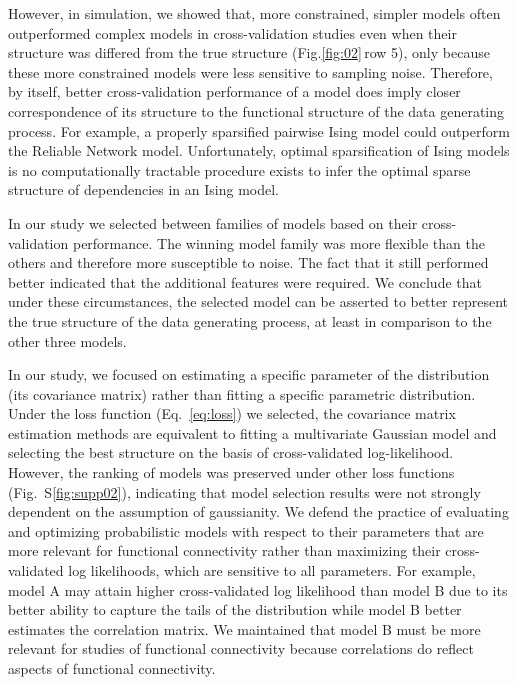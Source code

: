 \documentclass[10pt]{article}
\newcommand{\figref}[2]{Fig.\;\ref{fig:#1}\,#2}
\begin{document}
However, in simulation, we showed that, more constrained, simpler models often outperformed complex models in cross-validation studies even when their structure was differed from the true structure (\figref{02}{row 5}), only because these more constrained models were less sensitive to sampling noise. Therefore, by itself, better cross-validation performance of a model does imply closer correspondence of its structure to the functional structure of the data generating process. For example, a properly sparsified pairwise Ising model could outperform the Reliable Network model.  Unfortunately, optimal sparsification of Ising models is no computationally tractable procedure exists to infer the optimal sparse structure of dependencies in an Ising model.

In our study we selected between families of models based on their cross-validation performance. The winning model family was more flexible than the others and therefore more susceptible to noise. The fact that it still performed better indicated that the additional features were required. We conclude that under these circumstances, the selected model can be asserted to better represent the true structure of the data generating process, at least in comparison to the other three models.

In our study, we focused on estimating a specific parameter of the distribution (its covariance matrix) rather than fitting a specific parametric distribution.  Under the loss function (Eq.~\ref{eq:loss}) we selected, the covariance matrix estimation methods are equivalent to fitting a multivariate Gaussian model and selecting the best structure on the basis of cross-validated log-likelihood. However, the ranking of models was preserved under other loss functions (Fig.~S\ref{fig:supp02}), indicating that model selection results were not strongly dependent on the assumption of gaussianity. We defend the practice of evaluating and optimizing probabilistic models with respect to their parameters that are more relevant for functional connectivity rather than maximizing their cross-validated log likelihoods, which are sensitive to all parameters. For example, model A may attain higher cross-validated log likelihood than model B due to its better ability to capture the tails of the distribution while model B better estimates the correlation matrix. We maintained that model B must be more relevant for studies of functional connectivity because correlations do reflect aspects of functional connectivity.
\end{document}
